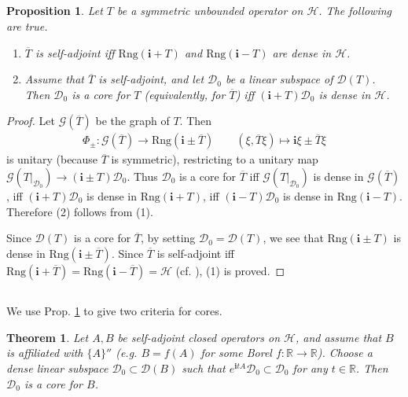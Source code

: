 \documentclass[12pt,b5paper,notitlepage]{article}
\theoremstyle{definition}
\theoremstyle{plain}
\newtheorem{thm}[df]{Theorem}
\newtheorem{pp}[df]{Proposition}
\newcommand{\mc}{\mathcal}
\newcommand{\ovl}{\overline}
\newcommand{\Dom}{\scr{D}}
\newcommand{\scr}{\mathscr}
\newcommand{\im}{\mathbf{i}}
\newcommand{\Rbb}{\mathbb R}
\newcommand{\Rng}{\mathrm{Rng}}
\numberwithin{equation}{section}
\begin{document}
\subsection{}




\begin{pp}\label{lb31}
Let $T$ be a symmetric unbounded operator on $\mc H$. The following are true.
\begin{enumerate}[label=(\arabic*)]
\item $\ovl T$ is self-adjoint iff $\Rng(\im+T)$ and $\Rng(\im-T)$ are dense in $\mc H$.
\item Assume that $\ovl T$ is self-adjoint, and let $\Dom_0$ be a linear subspace of $\Dom(T)$. Then $\Dom_0$ is a core for $T$ (equivalently, for $\ovl T$) iff $(\im+T)\Dom_0$ is dense in $\mc H$.
\end{enumerate}
\end{pp}

\begin{proof}
Let $\scr G(\ovl T)$ be the graph of $T$. Then
\begin{align*}
\Phi_\pm: \scr G(\ovl T)\rightarrow \Rng(\im\pm\ovl T)\qquad (\xi,\ovl T\xi)\mapsto \im\xi\pm\ovl T\xi
\end{align*}
is unitary (because $\ovl T$ is symmetric), restricting to a unitary map $\scr G(T|_{\Dom_0})\rightarrow (\im\pm T)\Dom_0$. Thus $\Dom_0$ is a core for $\ovl T$ iff $\scr G(T|_{\Dom_0})$ is dense in $\scr G(\ovl T)$, iff $(\im+ T)\Dom_0$ is dense in $\Rng(\im+T)$, iff $(\im- T)\Dom_0$ is dense in $\Rng(\im-T)$. Therefore (2) follows from (1).

Since $\Dom(T)$ is a core for $\ovl T$, by setting $\Dom_0=\Dom(T)$, we see that $\Rng(\im\pm T)$ is dense in $\Rng(\im\pm\ovl T)$. Since $\ovl T$ is self-adjoint iff $\Rng(\im+\ovl T)=\Rng(\im-\ovl T)=\mc H$ (cf. \cite[Sec. 10]{Gui-S}), (1) is proved.
\end{proof}





\subsection{}

We use Prop. \ref{lb31} to give two criteria for cores.


\begin{thm}\label{lb58}
Let $A,B$ be self-adjoint closed operators on $\mc H$, and assume that $B$ is affiliated with $\{A\}''$ (e.g. $B=f(A)$ for some Borel $f:\Rbb\rightarrow\Rbb$). Choose a dense linear subspace $\Dom_0\subset\Dom(B)$ such that $e^{\im tA}\Dom_0\subset\Dom_0$ for any $t\in\Rbb$. Then $\Dom_0$ is a core for $B$.
\end{thm}
\end{document}
